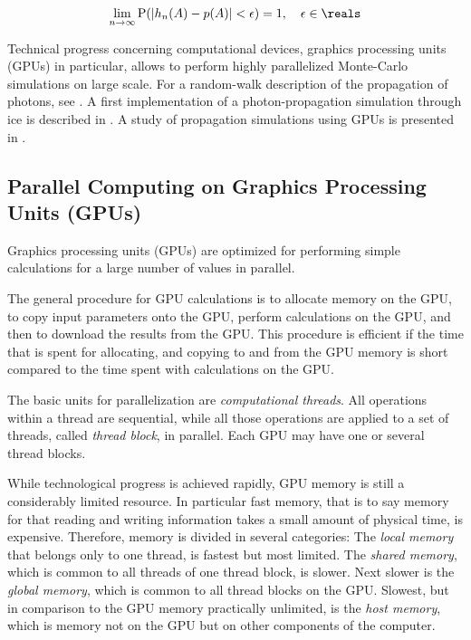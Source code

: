 $$
  \lim_{n \rightarrow \infty} \text{P}(|h_n(A) - p(A)| < \epsilon) = 1, \ \ \ \epsilon \in \reals
$$

Technical progress concerning computational devices, graphics processing units (GPUs) in particular, allows to perform highly parallelized Monte-Carlo simulations on large scale. For a random-walk description of the propagation of photons, see \cite{absorption1997}. A first implementation of a photon-propagation simulation through ice is described in \cite{lundberg}. A study of propagation simulations using GPUs is presented in \cite{ppcpaper}.


\subsection{Parallel Computing on Graphics Processing Units (GPUs)}
\label{sec:parallel_computing}

Graphics processing units (GPUs) are optimized for performing simple calculations for a large number of values in parallel.

The general procedure for GPU calculations is to allocate memory on the GPU, to copy input parameters onto the GPU, perform calculations on the GPU, and then to download the results from the GPU. This procedure is efficient if the time that is spent for allocating, and copying to and from the GPU memory is short compared to the time spent with calculations on the GPU. \cite{cudacourse}

The basic units for parallelization are \textit{computational threads}. All operations within a thread are sequential, while all those operations are applied to a set of threads, called \textit{thread block}, in parallel. Each GPU may have one or several thread blocks. \cite{cudacourse}

While technological progress is achieved rapidly, GPU memory is still a considerably limited resource. In particular fast memory, that is to say memory for that reading and writing information takes a small amount of physical time, is expensive. Therefore, memory is divided in several categories: The \textit{local memory} that belongs only to one thread, is fastest but most limited. The \textit{shared memory}, which is common to all threads of one thread block, is slower. Next slower is the \textit{global memory}, which is common to all thread blocks on the GPU. Slowest, but in comparison to the GPU memory practically unlimited, is the \textit{host memory}, which is memory not on the GPU but on other components of the computer. \cite{cudacourse}

